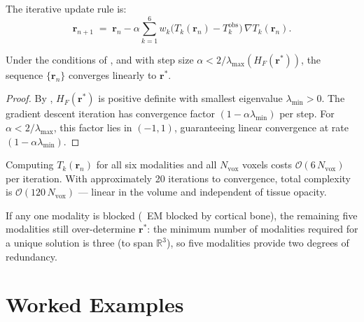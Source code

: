 The iterative update rule is:
\begin{equation}
    \mathbf{r}_{n+1}
    \;=\; \mathbf{r}_n
        - \alpha \sum_{k=1}^{6} w_k
          \bigl(T_k(\mathbf{r}_n) - T_k^{\mathrm{obs}}\bigr)\,
          \nabla T_k(\mathbf{r}_n).
    \label{eq:gradient-descent}
\end{equation}

\begin{proposition}
\label{prop:convergence}
Under the conditions of , and with step size
$\alpha < 2/\lambda_{\max}(H_F(\mathbf{r}^{*}))$, the sequence
$\{\mathbf{r}_n\}$ converges linearly to $\mathbf{r}^{*}$.
\end{proposition}

\begin{proof}
By , $H_F(\mathbf{r}^{*})$ is positive definite with
smallest eigenvalue $\lambda_{\min} > 0$.  The gradient descent iteration
 has convergence factor $(1 - \alpha\lambda_{\min})$
per step.  For $\alpha < 2/\lambda_{\max}$, this factor lies in $(-1, 1)$,
guaranteeing linear convergence at rate $(1 - \alpha\lambda_{\min})$.
\end{proof}

\begin{remark}
\label{rem:complexity}
Computing $T_k(\mathbf{r}_n)$ for all six modalities and all
$N_{\mathrm{vox}}$ voxels costs $\mathcal{O}(6\,N_{\mathrm{vox}})$ per
iteration.  With approximately 20 iterations to convergence, total complexity
is $\mathcal{O}(120\,N_{\mathrm{vox}})$ --- linear in the volume and
independent of tissue opacity.
\end{remark}

\begin{proposition}
\label{prop:robustness}
If any one modality is blocked (\eg\ EM blocked by cortical bone), the
remaining five modalities still over-determine $\mathbf{r}^{*}$: the minimum
number of modalities required for a unique solution is three (to span
$\mathbb{R}^3$), so five modalities provide two degrees of redundancy.
\end{proposition}

\section{Worked Examples}
\label{sec:worked-examples}

